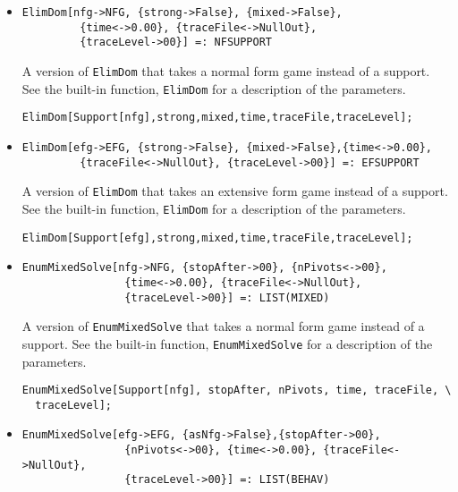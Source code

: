 \begin{itemize}
\item{}
\protect \large \begin{verbatim}
ElimDom[nfg->NFG, {strong->False}, {mixed->False}, 
         {time<->0.00}, {traceFile<->NullOut}, 
         {traceLevel->00}] =: NFSUPPORT
\end{verbatim}\normalsize

\bd 
A version of \verb+ElimDom+ that takes a normal form game instead
of a support.  See the built-in function, \verb+ElimDom+ for a
description of the parameters.
\begin{verbatim}
ElimDom[Support[nfg],strong,mixed,time,traceFile,traceLevel];
\end{verbatim} 
\ed

\item{}
\protect \large \begin{verbatim}
ElimDom[efg->EFG, {strong->False}, {mixed->False},{time<->0.00}, 
         {traceFile<->NullOut}, {traceLevel->00}] =: EFSUPPORT
\end{verbatim}\normalsize

\bd 
A version of \verb+ElimDom+ that takes an extensive form game instead
of a support.  See the built-in function, \verb+ElimDom+ for a
description of the parameters.
\begin{verbatim}
ElimDom[Support[efg],strong,mixed,time,traceFile,traceLevel];
\end{verbatim} 
\ed

\item{}
\protect \large \begin{verbatim}
EnumMixedSolve[nfg->NFG, {stopAfter->00}, {nPivots<->00}, 
                {time<->0.00}, {traceFile<->NullOut}, 
                {traceLevel->00}] =: LIST(MIXED)
\end{verbatim}\normalsize

\bd 
A version of \verb+EnumMixedSolve+ that takes a normal form game instead
of a support.  See the built-in function, \verb+EnumMixedSolve+ for a
description of the parameters.
\begin{verbatim}
EnumMixedSolve[Support[nfg], stopAfter, nPivots, time, traceFile, \
  traceLevel];
\end{verbatim} 
\ed

\item{}
\protect \large \begin{verbatim}
EnumMixedSolve[efg->EFG, {asNfg->False},{stopAfter->00},
                {nPivots<->00}, {time<->0.00}, {traceFile<->NullOut}, 
                {traceLevel->00}] =: LIST(BEHAV)
\end{verbatim}\normalsize


\end{itemize}
